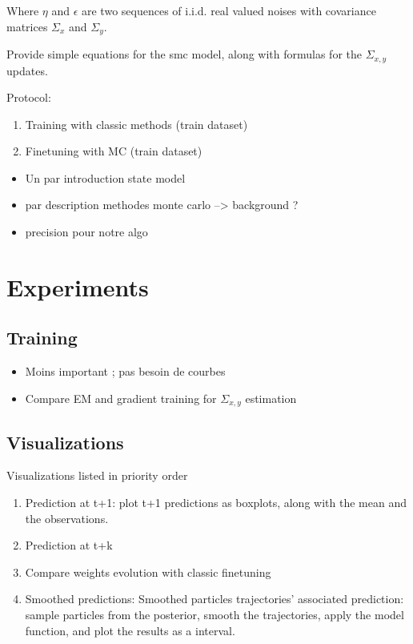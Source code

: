\documentclass{article}
\begin{document}
Where $\eta$ and $\epsilon$ are two sequences of i.i.d. real valued noises with covariance matrices $\Sigma_x$ and $\Sigma_y$.

Provide simple equations for the smc model, along with formulas for the $\Sigma_{x, y}$ updates.

Protocol:
\begin{enumerate}
	\item Training with classic methods (train dataset)
	\item Finetuning with MC (train dataset)
\end{enumerate}

\begin{itemize}
	\item Un par introduction state model
	\item par description methodes monte carlo --> background ?
	\item precision pour notre algo
\end{itemize}

\section{Experiments}
\label{sec:exp}

\subsection{Training}%
\label{sub:training}

\begin{itemize}
	\item Moins important ; pas besoin de courbes
	\item Compare EM and gradient training for $\Sigma_{x, y}$ estimation
\end{itemize}

\subsection{Visualizations}%
\label{sub:visualizations}

Visualizations listed in priority order
\begin{enumerate}
	\item Prediction at t+1: plot t+1 predictions as boxplots, along with the mean and the observations.
	\item Prediction at t+k
	\item Compare weights evolution with classic finetuning
	\item Smoothed predictions: Smoothed particles trajectories' associated prediction: sample particles from the posterior, smooth the trajectories, apply the model function, and plot the results as a interval.
\end{enumerate}
\end{document}
